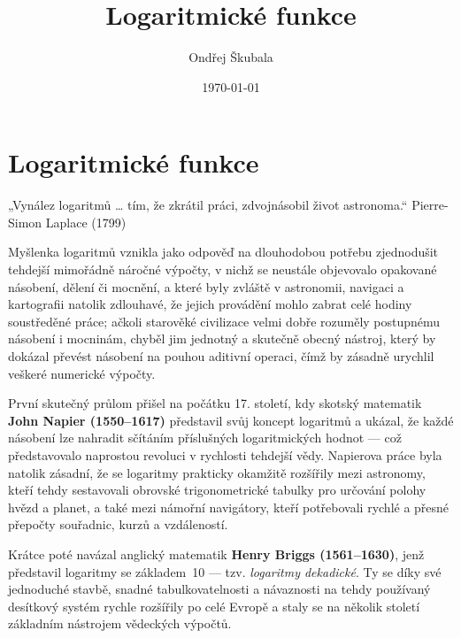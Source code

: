 \documentclass[12pt,a4paper]{article}
\title{Logaritmické funkce}
\author{Ondřej Škubala}
\date{\today}
\begin{document}
\maketitle
\newpage

\section{Logaritmické funkce}


\begin{quotebox}
{„Vynález logaritmů … tím, že zkrátil práci, zdvojnásobil život astronoma.“}
{Pierre-Simon Laplace (1799)}
\end{quotebox}


\begin{historicalbox}

Myšlenka logaritmů vznikla jako odpověď na dlouhodobou potřebu zjednodušit tehdejší mimořádně náročné výpočty, 
v nichž se neustále objevovalo opakované násobení, dělení či mocnění, 
a které byly zvláště v astronomii, navigaci a kartografii natolik zdlouhavé, 
že jejich provádění mohlo zabrat celé hodiny soustředěné práce; 
ačkoli starověké civilizace velmi dobře rozuměly postupnému násobení i mocninám, 
chyběl jim jednotný a skutečně obecný nástroj, který by dokázal převést násobení 
na pouhou aditivní operaci, čímž by zásadně urychlil veškeré numerické výpočty.  

První skutečný průlom přišel na počátku 17. století, 
kdy skotský matematik \textbf{John Napier (1550–1617)} představil svůj koncept logaritmů 
a ukázal, že každé násobení lze nahradit sčítáním příslušných logaritmických hodnot — 
což představovalo naprostou revoluci v rychlosti tehdejší vědy. 
Napierova práce byla natolik zásadní, že se logaritmy prakticky okamžitě rozšířily 
mezi astronomy, kteří tehdy sestavovali obrovské trigonometrické tabulky pro určování polohy hvězd a planet, 
a také mezi námořní navigátory, kteří potřebovali rychlé a přesné přepočty souřadnic, kurzů a vzdáleností.  

Krátce poté navázal anglický matematik \textbf{Henry Briggs (1561–1630)}, 
jenž představil logaritmy se základem~10 — tzv. \textit{logaritmy dekadické}. 
Ty se díky své jednoduché stavbě, snadné tabulkovatelnosti a návaznosti 
na tehdy používaný desítkový systém rychle rozšířily po celé Evropě 
a staly se na několik století základním nástrojem vědeckých výpočtů.  


\end{historicalbox}
\end{document}
